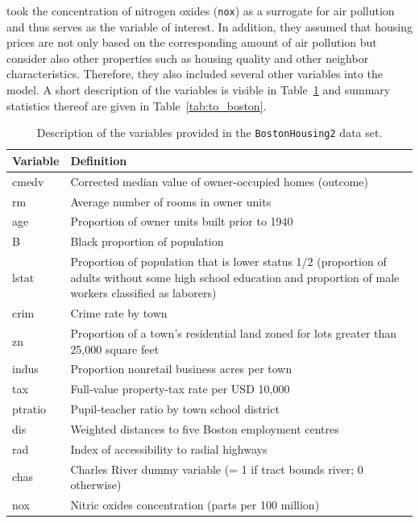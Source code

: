 \documentclass[11pt,a4paper,twoside]{book}\usepackage[]{graphicx}\usepackage[]{xcolor}
\begin{document}
\cite{Harrison1978} took the concentration of nitrogen oxides (\texttt{nox}) as a surrogate for air pollution and thus serves as the variable of interest. In addition, they assumed that housing prices are not only based on the corresponding amount of air pollution but consider also other properties such as housing quality and other neighbor characteristics. Therefore, they also included several other variables into the model. A short description of the variables is visible in Table~\ref{tab:variable_boston} and summary statistics thereof are given in Table~\ref{tab:to_boston}. 

\begin{table}[H]\begin{center}
\caption{Description of the variables provided in the \texttt{BostonHousing2} data set.}\label{tab:variable_boston}
\begingroup\footnotesize
\begin{tabular}{p{15mm}p{100mm}}
  \toprule
Variable & Definition \\ 
  \midrule
cmedv & Corrected median value of owner-occupied homes (outcome) \\ 
  rm & Average number of rooms in owner units \\ 
  age & Proportion of owner units built prior to 1940 \\ 
  B & Black proportion of population \\ 
  lstat & Proportion of population that is lower status 1/2 (proportion of adults without some high school education and proportion of male workers classified as laborers) \\ 
  crim & Crime rate by town \\ 
  zn & Proportion of a town's residential land zoned for lots greater than 25,000 square feet \\ 
  indus & Proportion nonretail business acres per town \\ 
  tax & Full-value property-tax rate per USD 10,000 \\ 
  ptratio & Pupil-teacher ratio by town school district \\ 
  dis & Weighted distances to five Boston employment centres \\ 
  rad & Index of accessibility to radial highways \\ 
  chas & Charles River dummy variable (= 1 if tract bounds river; 0 otherwise) \\ 
  nox & Nitric oxides concentration (parts per 100 million) \\ 
   \bottomrule
\end{tabular}
\endgroup

\end{center}\end{table}
\end{document}
